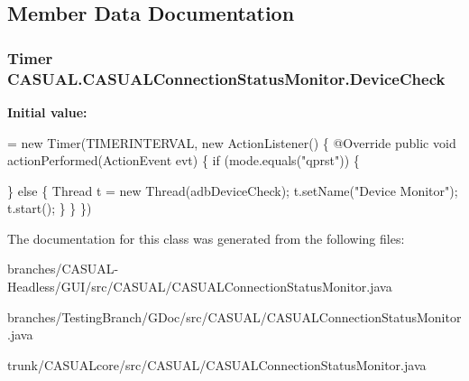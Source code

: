 \subsection{Member Data Documentation}
\hypertarget{classCASUAL_1_1CASUALConnectionStatusMonitor_a5d0a815804a5a296a4b8715e852f9b44}{
\subsubsection[{Device\-Check}]{\setlength{\rightskip}{0pt plus 5cm}Timer C\-A\-S\-U\-A\-L.\-C\-A\-S\-U\-A\-L\-Connection\-Status\-Monitor.\-Device\-Check\hspace{0.3cm}{\ttfamily [static]}}}\label{classCASUAL_1_1CASUALConnectionStatusMonitor_a5d0a815804a5a296a4b8715e852f9b44}
{\bfseries Initial value\-:}
\begin{DoxyCode}
= \textcolor{keyword}{new} Timer(TIMERINTERVAL, \textcolor{keyword}{new} ActionListener() \{
        @Override
        \textcolor{keyword}{public} \textcolor{keywordtype}{void} actionPerformed(ActionEvent evt) \{
            \textcolor{keywordflow}{if} (mode.equals(\textcolor{stringliteral}{"qprst"})) \{
                
            \} \textcolor{keywordflow}{else} \{  
                Thread t = \textcolor{keyword}{new} Thread(adbDeviceCheck);
                t.setName(\textcolor{stringliteral}{"Device Monitor"});
                t.start();
            \}
        \}
    \})
\end{DoxyCode}


The documentation for this class was generated from the following files\-:\begin{DoxyCompactItemize}
\item 
branches/\-C\-A\-S\-U\-A\-L-\/\-Headless/\-G\-U\-I/src/\-C\-A\-S\-U\-A\-L/C\-A\-S\-U\-A\-L\-Connection\-Status\-Monitor.\-java\item 
branches/\-Testing\-Branch/\-G\-Doc/src/\-C\-A\-S\-U\-A\-L/C\-A\-S\-U\-A\-L\-Connection\-Status\-Monitor.\-java\item 
trunk/\-C\-A\-S\-U\-A\-Lcore/src/\-C\-A\-S\-U\-A\-L/C\-A\-S\-U\-A\-L\-Connection\-Status\-Monitor.\-java\end{DoxyCompactItemize}
